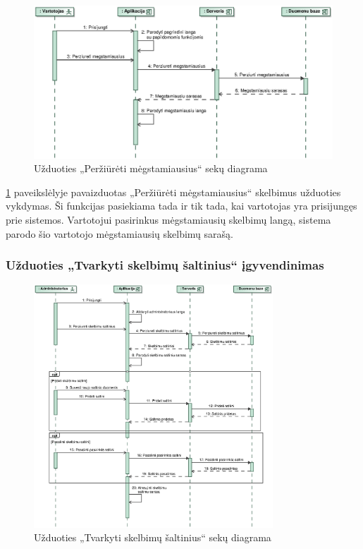 \documentclass[12pt]{article}
\begin{document}
	\begin{figure}[h]
		\begin{center}
			\includegraphics[width=\textwidth]{PerziuretiMegstamiausius.eps}
			\caption{Užduoties „Peržiūrėti mėgstamiausius“ sekų diagrama\label{ViewFavSeq}}
		\end{center}
	\end{figure}
	
	\ref{ViewFavSeq} paveikslėlyje pavaizduotas „Peržiūrėti mėgstamiausius“ skelbimus užduoties vykdymas. Ši funkcijas pasiekiama tada ir tik tada, kai vartotojas yra prisijungęs prie sistemos. Vartotojui pasirinkus mėgstamiausių skelbimų langą, sistema parodo šio vartotojo mėgstamiausių skelbimų sarašą.
	\pagebreak
	
	\subsubsection{Užduoties „Tvarkyti skelbimų šaltinius“ įgyvendinimas}
	
	\begin{figure}[h]
		\begin{center}
			\includegraphics[width=0.8\textwidth]{TvarkytiSkelbimuSaltinius.eps}
			\caption{Užduoties „Tvarkyti skelbimų šaltinius“ sekų diagrama\label{ManSouSeq}}
		\end{center}
	\end{figure}
	
\end{document}
